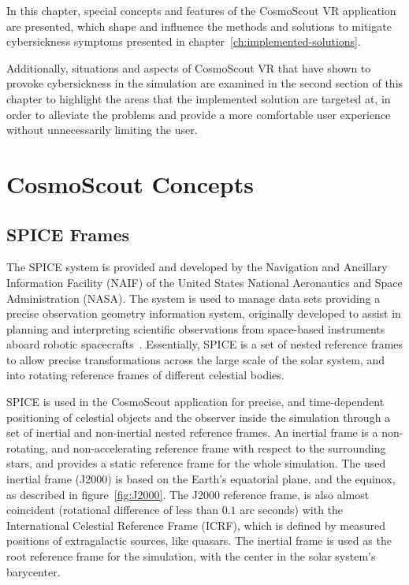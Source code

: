 In this chapter, special concepts and features of the CosmoScout VR application are presented, which shape and
influence the methods and solutions to mitigate cybersickness symptoms presented in
chapter~\ref{ch:implemented-solutions}.

Additionally, situations and aspects of CosmoScout VR that have shown to provoke cybersickness in the simulation are
examined in the second section of this chapter to highlight the areas that the implemented solution are targeted at,
in order to alleviate the problems and provide a more comfortable user experience without unnecessarily limiting the
user.


\section{CosmoScout Concepts}\label{sec:cosmoscout-concepts}

\subsection{SPICE Frames}\label{subsec:spice-frames}

The SPICE system is provided and developed by the Navigation and Ancillary Information Facility (NAIF) of the United
States National Aeronautics and Space Administration (NASA).
The system is used to manage data sets providing a precise observation geometry information system, originally
developed to assist in planning and interpreting scientific observations from space-based
instruments aboard robotic spacecrafts~\cite{NAIFbook, NAIFhomepage}.
Essentially, SPICE is a set of nested reference frames to allow precise transformations across the large scale
of the solar system, and into rotating reference frames of different celestial bodies.

SPICE is used in the CosmoScout application for precise, and time-dependent positioning of celestial objects and the
observer inside the simulation through a set of inertial and non-inertial nested reference frames.
An inertial frame is a non-rotating, and non-accelerating reference frame with respect to the surrounding stars, and
provides a static reference frame for the whole simulation.
The used inertial frame (J2000) is based on the Earth's equatorial plane, and the equinox, as described in
figure~\ref{fig:J2000}.
The J2000 reference frame, is also almost coincident (rotational difference of less than $0.1$ arc seconds) with the
International Celestial Reference Frame (ICRF), which is defined by measured positions of extragalactic sources, like
quasars.
The inertial frame is used as the root reference frame for the simulation, with the center in the solar system's
barycenter.

